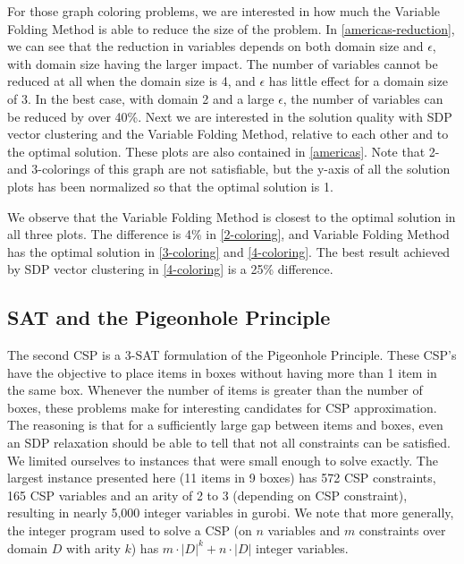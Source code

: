 \documentclass[12pt]{article} %
\begin{document}
For those graph coloring problems, we are interested in how much the Variable Folding Method is able to reduce the size of the problem. In \autoref{americas-reduction}, we can see that the reduction in variables depends on both domain size and $\epsilon$, with domain size having the larger impact. The number of variables cannot be reduced at all when the domain size is 4, and $\epsilon$ has little effect for a domain size of 3. In the best case, with domain 2 and a large $\epsilon$, the number of variables can be reduced by over 40\%. Next we are interested in the solution quality with SDP vector clustering and the Variable Folding Method, relative to each other and to the optimal solution. These plots are also contained in \autoref{americas}. Note that 2- and 3-colorings of this graph are not satisfiable, but the y-axis of all the solution plots has been normalized so that the optimal solution is 1. 

We observe that the Variable Folding Method is closest to the optimal solution in all three plots. The difference is 4\% in \ref{2-coloring}, and Variable Folding Method has the optimal solution in \ref{3-coloring} and \ref{4-coloring}. The best result achieved by SDP vector clustering in \ref{4-coloring} is a 25\% difference.

\FloatBarrier
\subsection{SAT and the Pigeonhole Principle}

The second CSP is a 3-SAT formulation of the Pigeonhole Principle. These CSP's have the objective to place items in boxes without having more than 1 item in the same box. Whenever the number of items is greater than the number of boxes, these problems make for interesting candidates for CSP approximation. The reasoning is that for a sufficiently large gap between items and boxes, even an SDP relaxation should be able to tell that not all constraints can be satisfied. We limited ourselves to instances that were small enough to solve exactly. The largest instance presented here (11 items in 9 boxes) has 572 CSP constraints, 165 CSP variables and an arity of 2 to 3 (depending on CSP constraint), resulting in nearly 5,000 integer variables in gurobi. We note that more generally, the integer program used to solve a CSP (on $n$ variables and $m$ constraints over domain $D$ with arity $k$) has $m \cdot |D|^k + n \cdot |D|$ integer variables.
\end{document}
